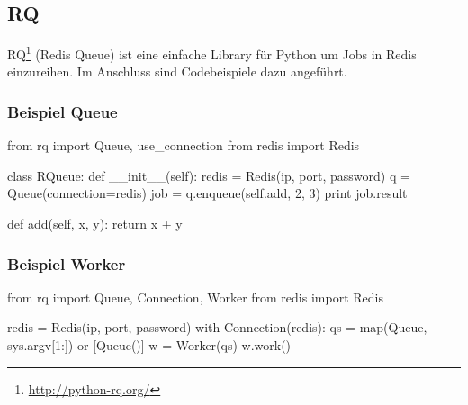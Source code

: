 \subsection{RQ}
\Gls{RQ}\footnote{\url{http://python-rq.org/}} (Redis Queue) ist eine einfache Library für Python um Jobs in Redis einzureihen. Im Anschluss sind Codebeispiele dazu angeführt.

\subsubsection{Beispiel Queue}
\begin{python}
from rq import Queue, use_connection
from redis import Redis

class RQueue:
   def __init__(self):
       redis = Redis(ip, port, password)
       q = Queue(connection=redis)
       job = q.enqueue(self.add, 2, 3)
       print job.result

   def add(self, x, y):
       return x + y
\end{python}

\subsubsection{Beispiel Worker}
\begin{python}
from rq import Queue, Connection, Worker
from redis import Redis

redis = Redis(ip, port, password)
with Connection(redis):
   qs = map(Queue, sys.argv[1:]) or [Queue()]
   w = Worker(qs)
   w.work()
\end{python}
\newpage